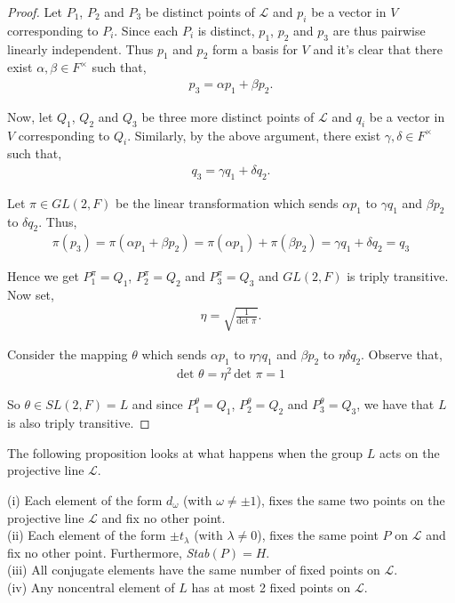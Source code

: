 \begin{proof} Let $P_1$, $P_2$ and $P_3$ be distinct points of $\mathscr{L}$ and $p_i$ be a vector in $V$ corresponding to $P_i$. Since each $P_i$ is distinct, $p_1$, $p_2$ and $p_3$ are thus pairwise linearly independent. Thus $p_1$ and $p_2$  form a basis for $V$ and it's clear that there exist $\alpha, \beta \in F^\times$ such that,
\begin{align*} p_3 = \alpha p_1 + \beta p_2.
\end{align*}

Now, let $Q_1$, $Q_2$ and $Q_3$ be three more distinct points of $\mathscr{L}$ and $q_i$ be a vector in $V$ corresponding to $Q_i$. Similarly, by the above argument, there exist $\gamma, \delta \in F^\times$ such that,
\begin{align*} q_3 = \gamma q_1 + \delta q_2.
\end{align*}

Let $\pi \in GL(2,F)$ be the linear transformation which sends $\alpha p_1$ to $\gamma q_1$  and $\beta p_2$ to $\delta q_2$. Thus,
\begin{align*} \pi(p_3) = \pi(\alpha p_1 + \beta p_2) = \pi(\alpha p_1) + \pi(\beta p_2) = \gamma q_1 + \delta q_2 = q_3 
\end{align*}

Hence we get $P^\pi_1 = Q_1$, $P^\pi_2 = Q_2$ and $P^\pi_3 = Q_3$ and $GL(2,F)$ is triply transitive. Now set,
\begin{align*} \eta = \sqrt{\frac{1}{\text{det }\pi}}.
\end{align*}

Consider the mapping $\theta$ which sends $\alpha p_1$ to $\eta \gamma q_1$ and $\beta p_2$ to $\eta \delta q_2$. Observe that,
\begin{align*} \text{det }\theta = \eta^2 \, \text{det } \pi = 1
\end{align*}

So $\theta \in SL(2,F) = L$ and since $P^\theta_1 = Q_1$, $P^\theta_2 = Q_2$ and $P^\theta_3 = Q_3$, we have that $L$ is also triply transitive. 

\end{proof}

The following proposition looks at what happens when the group $L$ acts on the projective line $\mathscr{L}$.

\begin{proposition} \label{6.7} (i) Each element of the form $d_\omega$ (with $\omega \neq \pm 1$), fixes the same two points on the projective line $\mathscr{L}$ and fix no other point. \vspace{3mm} \\
(ii) Each element of the form $\pm t_\lambda$ (with $\lambda \neq 0$), fixes the same point $P$ on $\mathscr{L}$ and fix no other point. Furthermore, \emph{Stab}$(P) = H$. \vspace{3mm} \\
(iii) All conjugate elements have the same number of fixed points on $\mathscr{L}$. \vspace{3mm} \\
(iv) Any noncentral element of $L$ has at most 2 fixed points on $\mathscr{L}$.
\end{proposition}

